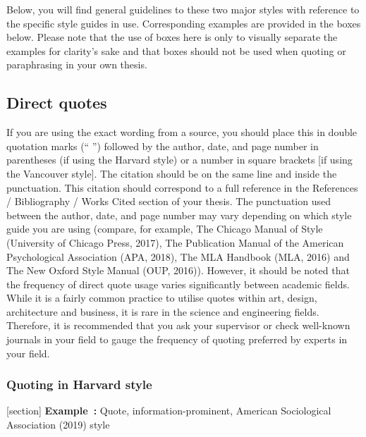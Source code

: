 \documentclass[english, 12pt, a4paper, elec, utf8, a-2b, online]{aaltothesis}
\begin{document}
Below, you will find general guidelines to these two major styles with reference
to the specific style guides in use. Corresponding examples are provided in the 
boxes below. Please note that the use of boxes here is only to visually separate
the examples for clarity’s sake and that boxes should not be used when quoting 
or paraphrasing in your own thesis.


\subsection*{Direct quotes}

If you are using the exact wording from a source, you should place this in 
double quotation marks (“ ”) followed by the author, date, and page number in 
parentheses (if using the Harvard style) or a number in square brackets [if 
using the Vancouver style]. The citation should be on the same line and inside 
the punctuation. This citation should correspond to a full reference in the 
References / Bibliography / Works Cited section of your thesis. The punctuation 
used between the author, date, and page number may vary depending on which style
guide you are using (compare, for example, The Chicago Manual of Style 
(University of Chicago Press, 2017), The Publication Manual of the American 
Psychological Association (APA, 2018), The MLA Handbook (MLA, 2016) and The New 
Oxford Style Manual (OUP, 2016)). However, it should be noted that the frequency
of direct quote usage varies significantly between academic fields. While it is 
a fairly common practice to utilise quotes within art, design, architecture and 
business, it is rare in the science and engineering fields. Therefore, it is 
recommended that you ask your supervisor or check well-known journals in your 
field to gauge the frequency of quoting preferred by experts in your field.


\subsubsection*{Quoting in Harvard style}

[section]
\textsf{\textbf{Example~\theexample:}} Quote, information-prominent, American 
Sociological Association (2019) style

\vspace{1ex}
\noindent
{}
\end{document}
